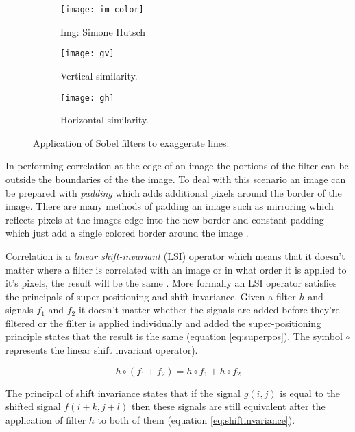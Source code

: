 \begin{figure}[H]
  \centering
  \begin{subfigure}[b]{0.3\textwidth}
      \texttt{[image: im\_color]}
      \caption{Img: Simone Hutsch}
  \end{subfigure}
  \begin{subfigure}[b]{0.3\textwidth}
      \texttt{[image: gv]}
      \caption{Vertical similarity.}
      \label{fig:vert}
  \end{subfigure}
  \begin{subfigure}[b]{0.3\textwidth}
      \texttt{[image: gh]}
      \caption{Horizontal similarity.}
      \label{fig:hoz}
  \end{subfigure}
  \caption{Application of Sobel filters to exaggerate lines.}
  \label{fig:sobel_apply}
\end{figure}

In performing correlation at the edge of an image the portions of the filter can be outside the boundaries of the the image. To deal with this scenario an image can be prepared with \emph{padding} which adds additional pixels around the border of the image. There are many methods of padding an image such as mirroring which reflects pixels at the images edge into the new border and constant padding which just add a single colored border around the image \cite{realtimerendering}.

Correlation is a \emph{linear shift-invariant} (LSI) operator which means that it doesn't matter where a filter is correlated with an image or in what order it is applied to it's pixels, the result will be the same \cite{cv_matlab}. More formally an LSI operator satisfies the principals of super-positioning and shift invariance. Given a filter $h$ and signals $f_1$ and $f_2$ it doesn't matter whether the signals are added before they're filtered or the filter is applied individually and added the super-positioning principle states that the result is the same (equation \ref{eq:superpos}). The symbol $\circ$ represents the linear shift invariant operator).

\begin{equation}
  \label{eq:superpos}
  h\circ(f_1 + f_2) = h\circ f_1 + h\circ f_2
\end{equation}

The principal of shift invariance states that if the signal $g(i,j)$ is equal to the shifted signal $f(i+k,j+l)$ then these signals are still equivalent after the application of filter $h$ to both of them (equation \ref{eq:shiftinvariance}).

